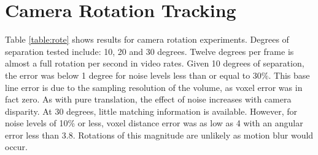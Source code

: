 \section{Camera Rotation Tracking}

Table \ref{table:rote} shows results for camera rotation experiments. Degrees of separation tested include: 10, 20 and 30 degrees. Twelve degrees per frame is almost a full rotation per second in video rates. Given 10 degrees of separation, the error was below 1 degree for noise levels less than or equal to 30\%. This base line error is due to the sampling resolution of the volume, as voxel error was in fact zero. As with pure translation, the effect of noise increases with camera disparity. At 30 degrees, little matching information is available. However, for noise levels of 10\% or less, voxel distance error was as low as 4 with an angular error less than $3.8$. Rotations of this magnitude are unlikely as motion blur would occur.



